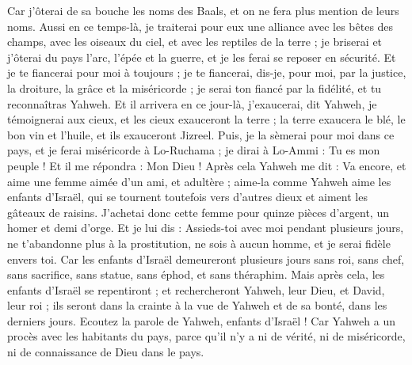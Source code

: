\begin{multicols}{2}
Car j'ôterai de sa bouche les noms des Baals, et on ne fera plus mention de leurs noms.
Aussi en ce temps-là, je traiterai pour eux une alliance avec les bêtes des champs, avec les oiseaux du ciel, et avec les reptiles de la terre ; je briserai et j'ôterai du pays l'arc, l'épée et la guerre, et je les ferai se reposer en sécurité.
Et je te fiancerai pour moi à toujours ; je te fiancerai, dis-je, pour moi, par la justice, la droiture, la grâce et la miséricorde ;
je serai ton fiancé par la fidélité, et tu reconnaîtras Yahweh.
Et il arrivera en ce jour-là, j'exaucerai, dit Yahweh, je témoignerai aux cieux, et les cieux exauceront la terre ;
la terre exaucera le blé, le bon vin et l'huile, et ils exauceront Jizreel. 
Puis, je la sèmerai pour moi dans ce pays, et je ferai miséricorde à Lo-Ruchama ; je dirai à Lo-Ammi : Tu es mon peuple ! Et il me répondra : Mon Dieu !
\VerseOne{}Après cela Yahweh me dit : Va encore, et aime une femme aimée d'un ami, et adultère ; aime-la comme Yahweh aime les enfants d'Israël, qui se tournent toutefois vers d'autres dieux et aiment les gâteaux de raisins.
J'achetai donc cette femme pour quinze pièces d'argent, un homer et demi d'orge.
Et je lui dis : Assieds-toi avec moi pendant plusieurs jours, ne t'abandonne plus à la prostitution, ne sois à aucun homme, et je serai fidèle envers toi.
Car les enfants d'Israël demeureront plusieurs jours sans roi, sans chef, sans sacrifice, sans statue, sans éphod, et sans théraphim.
Mais après cela, les enfants d'Israël se repentiront ; et rechercheront Yahweh, leur Dieu, et David, leur roi ; ils seront dans la crainte à la vue de Yahweh et de sa bonté, dans les derniers jours.
\VerseOne{}Ecoutez la parole de Yahweh, enfants d'Israël ! Car Yahweh a un procès avec les habitants du pays, parce qu'il n'y a ni de vérité, ni de miséricorde, ni de connaissance de Dieu dans le pays.

\end{multicols}
